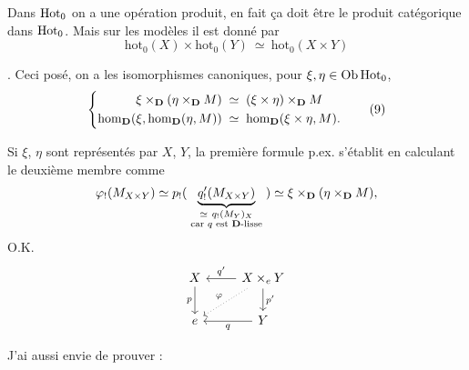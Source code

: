 Dans $\mathrm{Hot}_0$ on a une opération produit, en fait ça doit être le produit catégorique dans $\mathrm{Hot}_0$. Mais sur les modèles il est donné par
\[
\mathrm{hot}_0(X) \times \mathrm{hot}_0(Y) \ \simeq \ \mathrm{hot}_0(X \times Y)
\tag*{(8)}
\] %


. Ceci posé, on a les isomorphismes canoniques, pour $\xi,\eta\in\mathrm{Ob}\,\mathrm{Hot}_0$,
\[
\left\{
\begin{aligned}
\xi\times_{\D}(\eta\times_{\D}M) &\;\simeq\; (\xi\times\eta)\times_{\D}M\\
\hm_{\D}(\xi,\hm_{\D}(\eta,M)) &\;\simeq\; \hm_{\D}(\xi\times\eta,M).
\end{aligned}
\right.
\tag*{(9)}
\]

Si $\xi$, $\eta$ sont représentés par $X$, $Y$, la première formule p.ex.
s’établit en calculant le deuxième membre comme
\[
\varphi_!(M_{X\times Y})\simeq p_!(\;\underbrace{q'_!(M_{X\times Y})}_{\substack{\simeq\ q_!(M_Y)_X\\ \text{car $q$ est $\mathbf{D}$-lisse}}}\;)\simeq\xi\times_{\mathbf{D}}(\eta\times_{\mathbf{D}}M),
\]
O.K.
\[
\begin{tikzcd}
X \ar[d,"p"'] & X\times_e Y \ar[l,"q'"'] \ar[d,"p'"] \ar[dl,dotted,"\varphi"'] \\
e & Y \ar[l,"q"]
\end{tikzcd}
\]

J’ai aussi envie de prouver :

